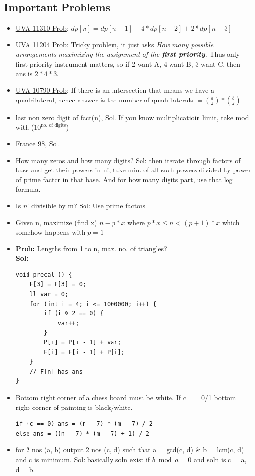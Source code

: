 \documentclass[8pt, a4paper, oneside, twocolumn]{extarticle}
\begin{document}
\subsection{Important Problems}
\begin{itemize}
	\item \href {https://uva.onlinejudge.org/external/113/11310.pdf}{UVA 11310 Prob}: $dp[n] = dp[n - 1] + 4 * dp[n - 2] + 2 * dp[n - 3]$
	\item \href {https://uva.onlinejudge.org/external/112/11204.pdf}{UVA 11204 Prob}: Tricky problem, it just asks \textit{How many possible arrangements maximizing the assignment of the \textbf{first priority}.} Thus only first priority instrument matters, so if 2 want A, 4 want B, 3 want C, then ans is $2 * 4 * 3$.
    \item \href {https://uva.onlinejudge.org/external/107/10790.pdf}{UVA 10790 Prob}: If there is an intersection that means we have a quadrilateral, hence answer is the number of quadrilaterals $ = \binom{a}{2} * \binom{b}{2}$.
    \item \href {https://uva.onlinejudge.org/external/5/568.pdf}{last non zero digit of fact(n)}, \href {https://gist.github.com/sourabhxyz/3e7d2c8c905cce7f04eb86400d4aac35}{Sol}. If you know multiplicatioin limit, take mod with ($10^{\text{no. of digits}}$)
    \item \href {https://uva.onlinejudge.org/external/5/542.pdf}{France 98}, \href {https://gist.github.com/sourabhxyz/94629bd0303d3c4f918bda3bdaf8e711}{Sol}.
    \item \href {https://uva.onlinejudge.org/external/100/10061.pdf}{How many zeros and how many digits?} Sol: then iterate through factors of base and get their powers in n!, take min. of all such powers divided by power of prime factor in that base. And for how many digits part, use that log formula.
    \item Is $n!$ divisible by m? Sol: Use prime factors
    \item Given n, maximize (find x) $n - p*x$ where $p*x \leq n < (p + 1)*x$ which somehow happens with $p = 1$
    \item \textbf{Prob: }Lengths from 1 to n, max. no. of triangles?
            \\\textbf{Sol: }\begin{verbatim}
void precal () {
    F[3] = P[3] = 0;
    ll var = 0;
    for (int i = 4; i <= 1000000; i++) {
        if (i % 2 == 0) {
            var++;
        }
        P[i] = P[i - 1] + var;
        F[i] = F[i - 1] + P[i];
    }
    // F[n] has ans
}
            \end{verbatim}
    \item Bottom right corner of a chess board must be white. If c == 0/1 bottom right corner of painting is black/white.
    \begin{verbatim}
if (c == 0) ans = (n - 7) * (m - 7) / 2
else ans = ((n - 7) * (m - 7) + 1) / 2
    \end{verbatim}
    \item for 2 nos (a, b) output 2 nos (c, d) such that a = gcd(c, d) \& b = lcm(c, d) and c is minimum. Sol: basically soln exist if $b \bmod a = 0$ and soln is c = a, d = b.
\end{itemize}
\end{document}
